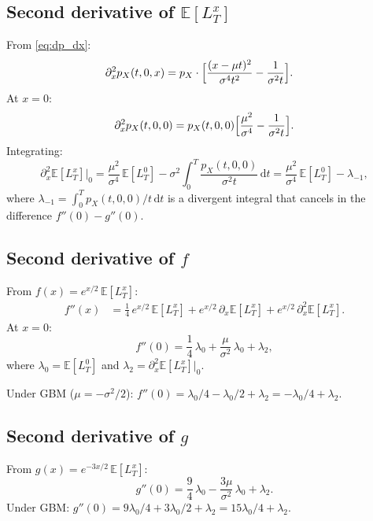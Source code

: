 \documentclass[11pt]{article}
\theoremstyle{definition}
\theoremstyle{remark}
\newcommand{\E}{\mathbb{E}}
\newcommand{\dd}{\,\mathrm{d}}
\begin{document}
\subsection{Second derivative of $\E[L^x_T]$}

From \eqref{eq:dp_dx}:
\begin{align}
\partial_x^2 p_X(t, 0, x)
&= p_X \cdot \Bigl[\frac{(x-\mu t)^2}{\sigma^4 t^2}
- \frac{1}{\sigma^2 t}\Bigr].
\label{eq:d2p}
\end{align}
At $x = 0$:
\begin{equation}\label{eq:d2p_0}
\partial_x^2 p_X(t, 0, 0)
= p_X(t, 0, 0)\Bigl[\frac{\mu^2}{\sigma^4}
- \frac{1}{\sigma^2 t}\Bigr].
\end{equation}
Integrating:
\begin{equation}\label{eq:d2L_0}
\partial_x^2\E[L^x_T]\big|_0
= \frac{\mu^2}{\sigma^4}\,\E[L^0_T]
- \sigma^2\int_0^T \frac{p_X(t,0,0)}{\sigma^2 t}\dd t
= \frac{\mu^2}{\sigma^4}\,\E[L^0_T] - \lambda_{-1},
\end{equation}
where $\lambda_{-1} = \int_0^T p_X(t,0,0)/t\dd t$ is a divergent
integral that cancels in the difference $f''(0) - g''(0)$.

\subsection{Second derivative of $f$}

From $f(x) = e^{x/2}\,\E[L^x_T]$:
\begin{align}
f''(x) &= \frac{1}{4}\,e^{x/2}\,\E[L^x_T]
+ e^{x/2}\,\partial_x\E[L^x_T]
+ e^{x/2}\,\partial_x^2\E[L^x_T].
\label{eq:f_second_full}
\end{align}
At $x = 0$:
\begin{equation}\label{eq:f_second_0}
f''(0) = \frac{1}{4}\,\lambda_0
+ \frac{\mu}{\sigma^2}\,\lambda_0 + \lambda_2,
\end{equation}
where $\lambda_0 = \E[L^0_T]$ and
$\lambda_2 = \partial_x^2\E[L^x_T]\big|_0$.

Under GBM ($\mu = -\sigma^2/2$):
$f''(0) = \lambda_0/4 - \lambda_0/2 + \lambda_2
= -\lambda_0/4 + \lambda_2$.

\subsection{Second derivative of $g$}

From $g(x) = e^{-3x/2}\,\E[L^x_T]$:
\begin{equation}\label{eq:g_second_0}
g''(0) = \frac{9}{4}\,\lambda_0
- \frac{3\mu}{\sigma^2}\,\lambda_0 + \lambda_2.
\end{equation}
Under GBM:
$g''(0) = 9\lambda_0/4 + 3\lambda_0/2 + \lambda_2
= 15\lambda_0/4 + \lambda_2$.
\end{document}
